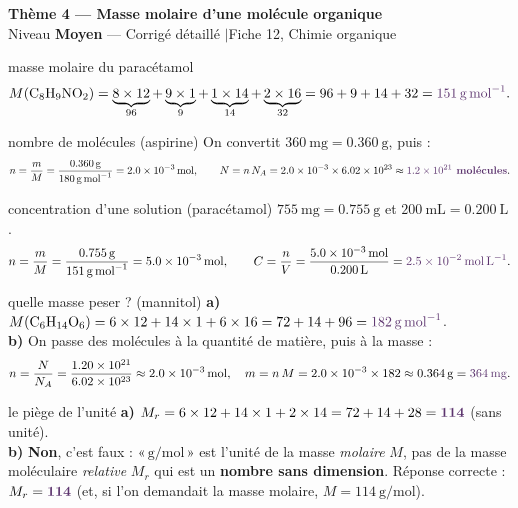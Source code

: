 \documentclass[11pt,a4paper]{article}
\newcommand{\rep}[1]{\textcolor{primarydark}{\textbf{#1}}}
\newcommand{\banner}[2]{%
\begin{tcolorbox}[enhanced,colback=excol,colframe=excol,arc=5pt,boxrule=0pt,
   left=5mm,right=5mm,top=2.5mm,bottom=2.5mm,coltext=white]
{\large\bfseries #1}\\[1pt]{\small #2}
\end{tcolorbox}\vspace{2pt}}
\begin{document}
\banner{Thème 4 — Masse molaire d'une molécule organique}{Niveau \textbf{Moyen} — Corrigé détaillé \quad$\vert$\quad Fiche 12, Chimie organique}

\begin{corr}{masse molaire du paracétamol}
\[ M(\ce{C8H9NO2}) = \underbrace{8\times12}_{96} + \underbrace{9\times1}_{9} + \underbrace{1\times14}_{14} + \underbrace{2\times16}_{32} = 96+9+14+32 = \rep{\qty{151}{\g\per\mol}}. \]
\end{corr}

\begin{corr}{nombre de molécules (aspirine)}
On convertit $\qty{360}{\mg}=\qty{0,360}{\g}$, puis :
\[ n=\frac{m}{M}=\frac{\qty{0,360}{\g}}{\qty{180}{\g\per\mol}}=\qty{2,0e-3}{\mol}, \qquad
N=n\,N_A=\qty{2,0e-3}{}\times\qty{6,02e23}{}\approx\rep{\qty{1,2e21}{}\ \text{molécules}}. \]
\end{corr}

\begin{corr}{concentration d'une solution (paracétamol)}
$\qty{755}{\mg}=\qty{0,755}{\g}$ et $\qty{200}{\mL}=\qty{0,200}{\L}$.
\[ n=\frac{m}{M}=\frac{\qty{0,755}{\g}}{\qty{151}{\g\per\mol}}=\qty{5,0e-3}{\mol}, \qquad
C=\frac{n}{V}=\frac{\qty{5,0e-3}{\mol}}{\qty{0,200}{\L}}=\rep{\qty{2,5e-2}{\mol\per\L}}. \]
\end{corr}

\begin{corr}{quelle masse peser ? (mannitol)}
\textbf{a)} $M(\ce{C6H14O6}) = 6\times12 + 14\times1 + 6\times16 = 72+14+96 = \rep{\qty{182}{\g\per\mol}}$.\\
\textbf{b)} On passe des molécules à la quantité de matière, puis à la masse :
\[ n=\frac{N}{N_A}=\frac{\qty{1,20e21}{}}{\qty{6,02e23}{}}\approx\qty{2,0e-3}{\mol}, \quad
m=n\,M=\qty{2,0e-3}{}\times\qty{182}{}\approx\qty{0,364}{\g}=\rep{\qty{364}{\mg}}. \]
\end{corr}

\begin{corr}{le piège de l'unité}
\textbf{a)} $M_r = 6\times12+14\times1+2\times14 = 72+14+28 = \rep{114}$ (sans unité).\\
\textbf{b)} \rep{Non}, c'est faux : «\,$\si{\g\per\mol}$\,» est l'unité de la masse \emph{molaire} $M$, pas de la masse moléculaire \emph{relative} $M_r$ qui est un \textbf{nombre sans dimension}. Réponse correcte : $M_r = \rep{114}$ (et, si l'on demandait la masse molaire, $M = \qty{114}{\g\per\mol}$).
\end{corr}
\end{document}
